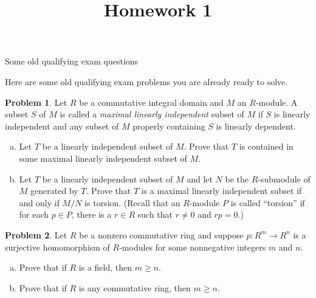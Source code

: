\documentclass[11pt]{article}
\title{}
\date{\vspace{-0.5in}}
\title{Homework 1}
\theoremstyle{definition}
\newtheorem{problem}{Problem}
\begin{document}
\thispagestyle{fancy}
\pagestyle{fancy}

\vspace{3em}

\begin{center}
	{\LARGE  Some old qualifying exam questions}
\end{center}


Here are some old qualifying exam problems you are already ready to solve.


\vspace{2em}




\begin{problem} Let $R$ be a commutative integral domain and $M$ an $R$-module. A subset $S$ of $M$ is called a {\em maximal linearly independent} subset of $M$ if $S$ is 
linearly independent and any subset of $M$ properly containing $S$ is linearly dependent.

\begin{enumerate}[(a)]

\item Let $T$ be a linearly independent subset of $M$. Prove that $T$ is contained in some maximal linearly independent subset of $M$.

\item Let $T$ be a linearly independent subset of $M$ and let $N$ be the $R$-submodule of $M$ generated by $T$. Prove that $T$ is a maximal linearly independent subset if and only
if $M/N$ is torsion. (Recall that an $R$-module $P$ is called ``torsion'' if for each $p \in P$, there is a $r \in R$ such that $r \ne 0$ and $rp = 0$.)

\end{enumerate}
\end{problem}



\begin{problem} Let $R$ be a nonzero commutative ring and suppose $p: R^m \to R^n$ is a surjective homomorphism of $R$-modules for some nonnegative integers $m$ and $n$. 

\begin{enumerate}[(a)]

\item Prove that if $R$ is a field, then $m \geq n$.

\item Prove that if $R$ is any commutative ring, then $m \geq n$. 

\end{enumerate}

\end{problem}
\end{document}
